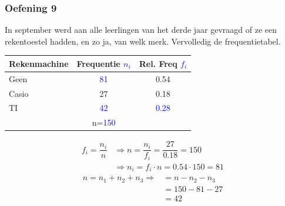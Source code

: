 \documentclass[13pt]{beamer}
\newenvironment{answer}
{\color{blue}}
{\color{black}}
\begin{document}
\begin{frame}
  \frametitle{Oefening 9}
  In september werd aan alle leerlingen van het derde jaar gevraagd of ze een rekentoestel hadden, en zo ja, van welk merk. Vervolledig de frequentietabel.
  \begin{center}
    \begin{tabular}{l|c|c}
      Rekenmachine & Frequentie \textcolor{blue}{$n_i$} & Rel. Freq \textcolor{blue}{$f_i$} \\\hline
      Geen         & \textcolor{blue}{81}               & 0.54                              \\\hline
      Casio        & 27                                 & 0.18                              \\\hline
      TI           & \textcolor{blue}{42}               & \textcolor{blue}{0.28}            \\\hline
                   & n=\textcolor{blue}{150}            &                                   \\
    \end{tabular}
  \end{center}
  \begin{answer}
    \begin{align*}
      f_i = \dfrac{n_i}{n} &\Rightarrow n=\dfrac{n_i}{f_i}=\dfrac{27}{0.18}=150\\
                           &\Rightarrow n_i=f_i \cdot n = 0.54 \cdot 150 = 81
    \end{align*}
    \begin{align*}
      n = n_1 + n_2 + n_3 \Rightarrow &= n - n_2 - n_3\\
                                      &= 150 - 81 - 27\\
                                      &= 42
    \end{align*}
  \end{answer}
\end{frame}
\end{document}
